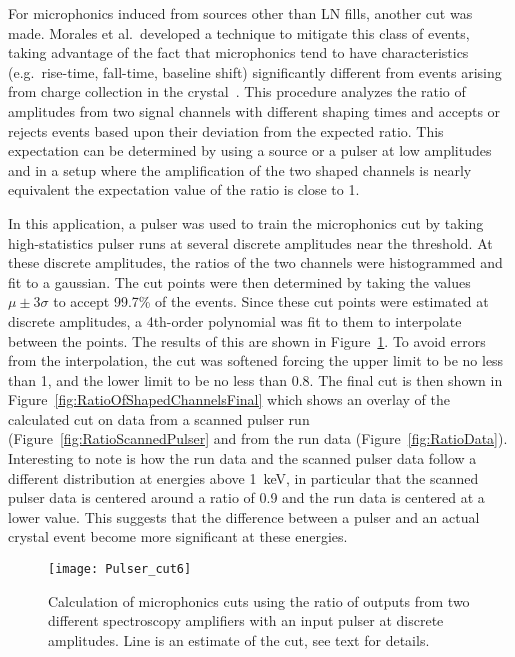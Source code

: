 	For microphonics induced from sources other than LN fills, another cut was made.  Morales et al.~developed a technique to mitigate this class of events, taking advantage of the fact that microphonics tend to have characteristics (e.g.~rise-time, fall-time, baseline shift) significantly different from events arising from charge collection in the crystal~\cite{Morales1992410}.  This procedure analyzes the ratio of amplitudes from two signal channels with different shaping times  and accepts or rejects events based upon their deviation from the expected ratio.  This expectation can be determined by using a source or a pulser at low amplitudes and in a setup where the amplification of the two shaped channels is nearly equivalent the expectation value of the ratio is close to 1.  
	
	In this application, a pulser was used to train the microphonics cut by taking high-statistics pulser runs at several discrete amplitudes near the threshold.  At these discrete amplitudes, the ratios of the two channels were histogrammed and fit to a gaussian.  The cut points were then determined by taking the values $\mu \pm 3 \sigma$ to accept 99.7\% of the events.  Since these cut points were estimated at discrete amplitudes, a 4th-order polynomial was fit to them to interpolate between the points.  The results of this are shown in Figure~\ref{fig:RatioOfShapedChannels}.  To avoid errors from the interpolation, the cut was softened forcing the upper limit to be no less than 1, and the lower limit to be no less than 0.8.  The final cut is then shown in Figure~\ref{fig:RatioOfShapedChannelsFinal} which shows an overlay of the calculated cut on data from a scanned pulser run (Figure~\ref{fig:RatioScannedPulser} and from the run data (Figure~\ref{fig:RatioData}).  Interesting to note is how the run data and the scanned pulser data follow a different distribution at energies above 1~keV, in particular that the scanned pulser data is centered around a ratio of 0.9 and the run data is centered at a lower value.  This suggests that the difference between a pulser and an actual crystal event become more significant at these energies.

			\begin{figure}
				\centering
				\texttt{[image: Pulser\_cut6]}
				\caption[Calculation of microphonics cuts]
				{Calculation of microphonics cuts using the ratio of outputs from two different spectroscopy amplifiers with an input pulser at discrete amplitudes.  Line is 
				an estimate of the cut, see text for details.}
				\label{fig:RatioOfShapedChannels}
			\end{figure}

